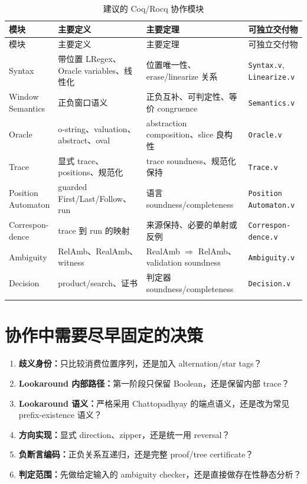 \documentclass[UTF8,a4paper,12pt]{ctexart}
\begin{document}
\begin{longtable}{p{2.3cm}p{3.8cm}p{3.7cm}p{2.7cm}}
\toprule
模块 & 主要定义 & 主要定理 & 可独立交付物 \\
\midrule
\endfirsthead
\toprule
模块 & 主要定义 & 主要定理 & 可独立交付物 \\
\midrule
\endhead
Syntax & 带位置 LRegex、Oracle variables、线性化 & 位置唯一性、erase/linearize 关系 & \texttt{Syntax.v}, \texttt{Linearize.v} \\
\shortstack[l]{Window\\Semantics} & 正负窗口语义 & 正负互补、可判定性、等价 congruence & \texttt{Semantics.v} \\
Oracle & o-string、valuation、abstract、oval & abstraction composition、slice 良构性 & \texttt{Oracle.v} \\
Trace & 显式 trace、positions、规范化 & trace soundness、规范化保持 & \texttt{Trace.v} \\
\shortstack[l]{Position\\Automaton} & guarded First/Last/Follow、run & 语言 soundness/completeness & \shortstack[l]{\texttt{Position}\\\texttt{Automaton.v}} \\
\shortstack[l]{Correspon-\\dence} & trace 到 run 的映射 & 来源保持、必要的单射或反例 & \shortstack[l]{\texttt{Correspon-}\\\texttt{dence.v}} \\
Ambiguity & RelAmb、RealAmb、witness & RealAmb $\Rightarrow$ RelAmb、validation soundness & \texttt{Ambiguity.v} \\
Decision & product/search、证书 & 判定器 soundness/completeness & \texttt{Decision.v} \\
\bottomrule
\caption{建议的 Coq/Rocq 协作模块}
\end{longtable}

\section{协作中需要尽早固定的决策}

\begin{enumerate}
  \item \textbf{歧义身份：}只比较消费位置序列，还是加入 alternation/star tags？
  \item \textbf{Lookaround 内部路径：}第一阶段只保留 Boolean，还是保留内部 trace？
  \item \textbf{Lookaround 语义：}严格采用 Chattopadhyay 的端点语义，还是改为常见 prefix-existence 语义？
  \item \textbf{方向实现：}显式 direction、zipper，还是统一用 reversal？
  \item \textbf{负断言编码：}正负关系互递归，还是完整 proof/tree certificate？
  \item \textbf{判定范围：}先做给定输入的 ambiguity checker，还是直接做存在性静态分析？
\end{enumerate}
\end{document}
